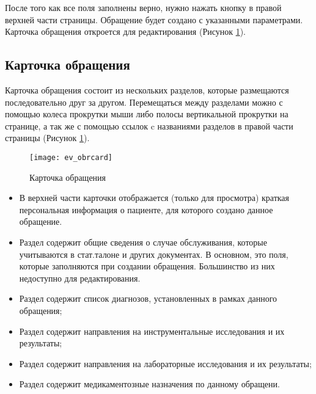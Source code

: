 {После того как все поля заполнены верно, нужно нажать кнопку  в правой верхней части страницы. Обращение будет создано с указанными параметрами.  Карточка обращения откроется для редактирования (Рисунок \ref{img_ev_obrcard}).

\subsection{Карточка обращения} \label{ev_obr}

Карточка обращения состоит из нескольких разделов, которые размещаются последовательно друг за другом. Перемещаться  между разделами можно с помощью колеса прокрутки мыши либо полосы вертикальной прокрутки на странице, а так же с помощью ссылок c названиями разделов в правой части страницы (Рисунок \ref{img_ev_obrcard}). 

\begin{figure}[!ht]\centering
	\texttt{[image: ev\_obrcard]}
	\caption{Карточка обращения}
	\label{img_ev_obrcard}
\end{figure}

\begin{itemize}
 \item В верхней части карточки отображается (только для просмотра) краткая персональная информация о пациенте, для которого создано данное обращение. 
 \item Раздел  содержит общие сведения о случае обслуживания, которые учитываются в стат.талоне и других документах. В основном, это поля, которые заполняются при создании обращения. Большинство из них недоступно для редактирования.
 \item Раздел  содержит список диагнозов, установленных в рамках данного обращения;
 \item Раздел  содержит направления на инструментальные исследования и их результаты;
 \item Раздел  содержит направления на лабораторные исследования и их результаты;
 \item Раздел  содержит медикаментозные назначения по данному обращени.
\end{itemize}
 
}
